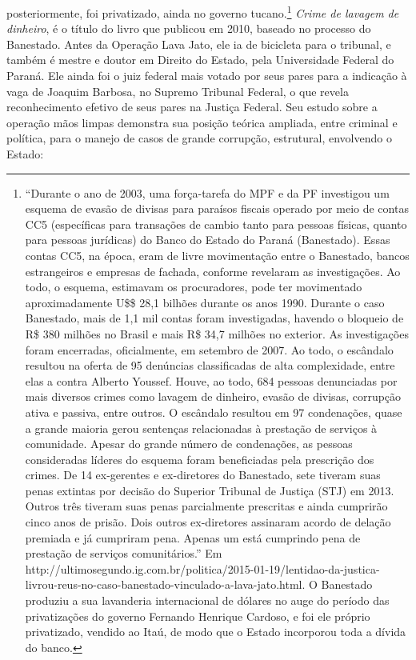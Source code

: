 posteriormente, foi privatizado, ainda no governo tucano.\footnote{``Durante
  o ano de 2003, uma força-tarefa do MPF e da PF investigou um esquema
  de evasão de divisas para paraísos fiscais operado por meio de contas
  CC5 (específicas para transações de cambio tanto para pessoas físicas,
  quanto para pessoas jurídicas) do Banco do Estado do Paraná
  (Banestado). Essas contas CC5, na época, eram de livre movimentação
  entre o Banestado, bancos estrangeiros e empresas de fachada, conforme
  revelaram as investigações. Ao todo, o esquema, estimavam os
  procuradores, pode ter movimentado aproximadamente U\$\$ 28,1 bilhões
  durante os anos 1990. Durante o caso Banestado, mais de 1,1 mil contas
  foram investigadas, havendo o bloqueio de R\$ 380 milhões no Brasil e
  mais R\$ 34,7 milhões no exterior. As investigações foram encerradas,
  oficialmente, em setembro de 2007. Ao todo, o escândalo resultou na
  oferta de 95 denúncias classificadas de alta complexidade, entre elas
  a contra Alberto Youssef. Houve, ao todo, 684 pessoas denunciadas por
  mais diversos crimes como lavagem de dinheiro, evasão de divisas,
  corrupção ativa e passiva, entre outros. O escândalo resultou em 97
  condenações, quase a grande maioria gerou sentenças relacionadas à
  prestação de serviços à comunidade. Apesar do grande número de
  condenações, as pessoas consideradas líderes do esquema foram
  beneficiadas pela prescrição dos crimes. De 14 ex-gerentes e
  ex-diretores do Banestado, sete tiveram suas penas extintas por
  decisão do Superior Tribunal de Justiça (STJ) em 2013. Outros três
  tiveram suas penas parcialmente prescritas e ainda cumprirão cinco
  anos de prisão. Dois outros ex-diretores assinaram acordo de delação
  premiada e já cumpriram pena. Apenas um está cumprindo pena de
  prestação de serviços comunitários.'' Em
  http://ultimosegundo.ig.com.br/politica/2015-01-19/lentidao-da-justica-livrou-reus-no-caso-banestado-vinculado-a-lava-jato.html.
  O Banestado produziu a sua lavanderia internacional de dólares no auge
  do período das privatizações do governo Fernando Henrique Cardoso, e
  foi ele próprio privatizado, vendido ao Itaú, de modo que o Estado
  incorporou toda a dívida do banco.} \emph{Crime de lavagem de
dinheiro}, é o título do livro que publicou em 2010, baseado no processo
do Banestado. Antes da Operação Lava Jato, ele ia de bicicleta para o
tribunal, e também é mestre e doutor em Direito do Estado, pela
Universidade Federal do Paraná. Ele ainda foi o juiz federal mais votado
por seus pares para a indicação à vaga de Joaquim Barbosa, no Supremo
Tribunal Federal, o que revela reconhecimento efetivo de seus pares na
Justiça Federal. Seu estudo sobre a operação mãos limpas demonstra sua
posição teórica ampliada, entre criminal e política, para o manejo de
casos de grande corrupção, estrutural, envolvendo o Estado:

